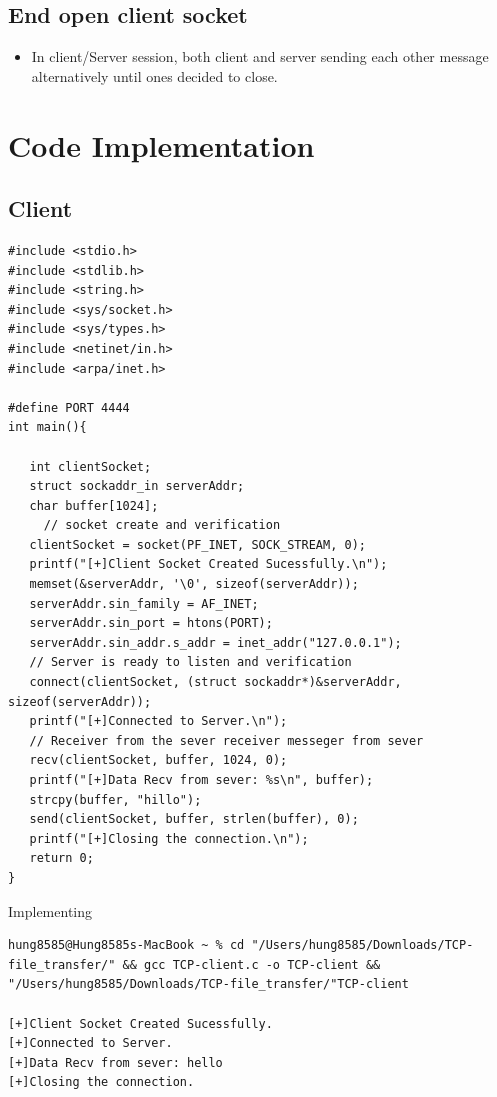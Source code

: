 \documentclass{article}
\begin{document}
\subsection{End open client socket}
\begin{itemize}
    \item In client/Server session, both client and server sending each other message alternatively until ones decided to close.
\end{itemize}
\newpage
\section{Code Implementation}
\subsection{Client}
\begin{lstlisting}
#include <stdio.h>
#include <stdlib.h>
#include <string.h>
#include <sys/socket.h>
#include <sys/types.h>
#include <netinet/in.h>
#include <arpa/inet.h>
 
#define PORT 4444
int main(){
  
   int clientSocket;
   struct sockaddr_in serverAddr;
   char buffer[1024];
     // socket create and verification
   clientSocket = socket(PF_INET, SOCK_STREAM, 0);
   printf("[+]Client Socket Created Sucessfully.\n");
   memset(&serverAddr, '\0', sizeof(serverAddr));
   serverAddr.sin_family = AF_INET;
   serverAddr.sin_port = htons(PORT);
   serverAddr.sin_addr.s_addr = inet_addr("127.0.0.1");
   // Server is ready to listen and verification
   connect(clientSocket, (struct sockaddr*)&serverAddr, sizeof(serverAddr));
   printf("[+]Connected to Server.\n");
   // Receiver from the sever receiver messeger from sever
   recv(clientSocket, buffer, 1024, 0);
   printf("[+]Data Recv from sever: %s\n", buffer);
   strcpy(buffer, "hillo");
   send(clientSocket, buffer, strlen(buffer), 0);
   printf("[+]Closing the connection.\n");
   return 0;
}
\end{lstlisting}
Implementing
\begin{lstlisting}
hung8585@Hung8585s-MacBook ~ % cd "/Users/hung8585/Downloads/TCP-file_transfer/" && gcc TCP-client.c -o TCP-client && "/Users/hung8585/Downloads/TCP-file_transfer/"TCP-client

[+]Client Socket Created Sucessfully.
[+]Connected to Server.
[+]Data Recv from sever: hello
[+]Closing the connection.
\end{lstlisting}
\end{document}
